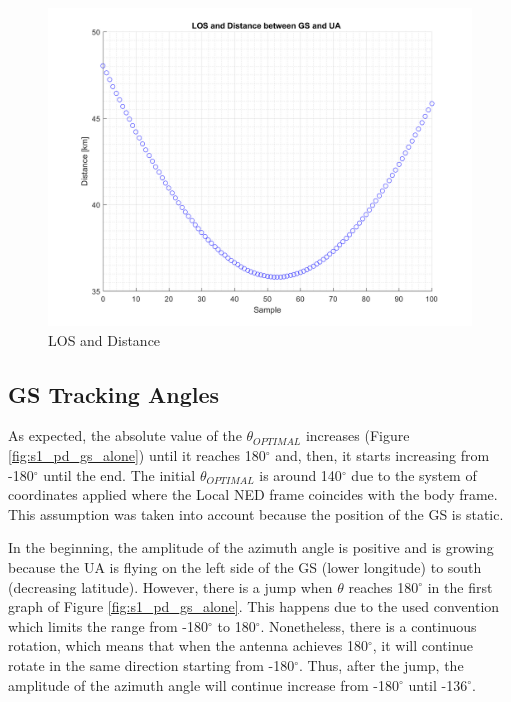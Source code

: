 \begin{figure}[H]
	\centering
	\includegraphics[scale=0.7]{figures/s1_los.png}
	\caption{LOS and Distance}
	\label{fig:s1_los}
\end{figure}

\subsection*{GS Tracking Angles}\label{GroundStation_scenario1}
As expected, the absolute value of the $\theta_{OPTIMAL}$ increases (Figure \ref{fig:s1_pd_gs_alone}) until it reaches 180$^{\circ}$  and, then, it starts increasing from -180$^{\circ}$ until the end. The initial $\theta_{OPTIMAL}$ is around 140$^{\circ}$ due to the system of coordinates applied where the Local NED frame coincides with the body frame. This assumption was taken into account because the position of the GS is static.

In the beginning, the amplitude of the azimuth angle is positive and is growing because the UA is flying on the left side of the GS (lower longitude) to south (decreasing latitude). However, there is a jump when $\theta$ reaches 180$^{\circ}$ in the first graph of Figure \ref{fig:s1_pd_gs_alone}. This happens due to the used convention which limits the range from -180$^{\circ}$ to 180$^{\circ}$. Nonetheless, there is a continuous rotation, which means that when the antenna achieves 180$^{\circ}$, it will continue rotate in the same direction starting from -180$^{\circ}$. Thus, after the jump, the amplitude of the azimuth angle will continue increase from -180$^{\circ}$ until -136$^{\circ}$.

